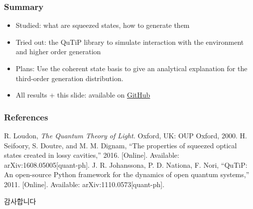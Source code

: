 \documentclass{beamer}
\begin{document}
\begin{frame}[c]
  \frametitle{Summary}
  \begin{itemize}
    \item Studied: what are squeezed states, how to generate them
    \item Tried out: the QuTiP library to simulate interaction with the environment and higher order generation
    \item Plans: Use the coherent state basis to give an analytical explanation for the third-order generation distribution.
    \item All results + this slide: available on \href{https://github.com/LimitEpsilon/quantum_sim}{GitHub}
  \end{itemize}
\end{frame}

\begin{frame}[c]
  \frametitle{References}
  \footnotesize{
    \begin{thebibliography}{99} %
       R. Loudon, \textit{The Quantum Theory of Light.} Oxford, UK: OUP Oxford, 2000.
       H. Seifoory, S. Doutre, and M. M. Dignam, ``The properties of squeezed optical states created in lossy cavities,'' 2016. [Online]. Available: arXiv:1608.05005[quant-ph].
       J. R. Johanssona, P. D. Nationa, F. Nori, ``QuTiP: An open-source Python framework for the dynamics of open quantum
      systems,'' 2011. [Online]. Available: arXiv:1110.0573[quant-ph].
    \end{thebibliography}
  }
\end{frame}

\begin{frame}[c]
  \centering\LARGE
  감사합니다\\[\baselineskip]
\end{frame}
\end{document}
